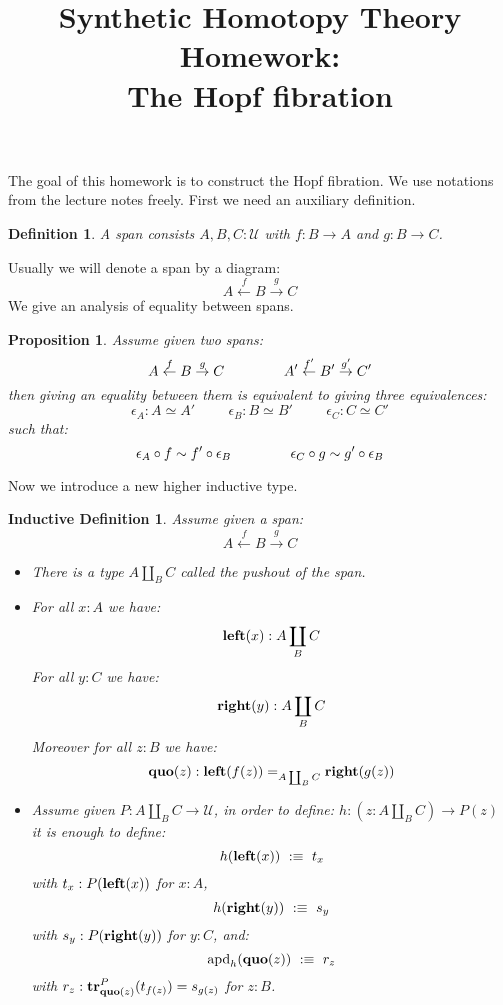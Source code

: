 \documentclass{article}[6pt]%
\title{Synthetic Homotopy Theory Homework: \\ The Hopf fibration}
\date{}
\newcommand{\U}{{\mathcal U}}
\renewcommand{\r}{\rightarrow}
\newcommand{\apd}{\mathrm{apd}}
\newcommand{\tr}{\mathrm{\bf tr}}
\newtheorem{definition}{Definition}
\newtheorem{proposition}{Proposition}
\newtheorem{ind_def}{Inductive Definition}
\newcommand{\lef}{\mathrm{\bf left}}
\newcommand{\righ}{\mathrm{\bf right}}
\newcommand{\quo}{\mathrm{\bf quo}}
\begin{document}
\maketitle



The goal of this homework is to construct the Hopf fibration. We use notations from the lecture notes freely. First we need an auxiliary definition.


\begin{definition}
A span consists $A,B,C:\U$ with $f:B\r A$ and $g:B\r C$.
\end{definition}

Usually we will denote a span by a diagram:
\[A \overset{f}{\leftarrow} B \overset{g}{\r} C\]
We give an analysis of equality between spans.

\begin{proposition}
Assume given two spans:
\[A \overset{f}{\leftarrow} B \overset{g}{\r} C \hspace{1.5cm} A' \overset{f'}{\leftarrow} B' \overset{g'}{\r} C'\]
then giving an equality between them is equivalent to giving three equivalences:
\[\epsilon_A : A \simeq A'  \hspace{1cm} \epsilon_B : B \simeq B'  \hspace{1cm} \epsilon_C : C \simeq C'\]
such that:
\[\epsilon_A \circ f \sim f'\circ \epsilon_B \hspace{1.5cm} \epsilon_C \circ g \sim g'\circ \epsilon_B\]
\end{proposition}

Now we introduce a new higher inductive type.

\begin{ind_def}
Assume given a span: 
\[A \overset{f}{\leftarrow} B \overset{g}{\r} C\]
\begin{itemize}
\item There is a type $A\coprod_B C$ called the pushout of the span.
\item For all $x:A$ we have:
\[\lef(x) : A\coprod_BC\] 
For all $y:C$ we have: 
\[\righ(y) : A\coprod_BC\] 
Moreover for all $z:B$ we have:
\[\quo(z) : \lef(f(z)) =_{A\coprod_BC} \righ(g(z))\]
\item Assume given $P : A\coprod_BC \r \U$, in order to define:
$h : (z:A\coprod_BC) \r P(z)$
it is enough to define:
\[h(\lef(x))\ :\equiv\ t_x\] 
with $t_x:P(\lef(x))$ for $x:A$, 
\[h(\righ(y))\ :\equiv\ s_y\] 
with $s_y:P(\righ(y))$ for $y:C$, and:
\[\apd_h(\quo(z)) \ :\equiv\  r_z\]
with $r_z : \tr^P_{\quo(z)} (t_{f(z)}) = s_{g(z)} $ for $z:B$.
\end{itemize}
\end{ind_def}
\end{document}
